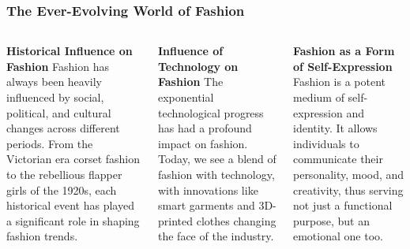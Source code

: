 \documentclass[5pt]{beamer}
\begin{document}
\begin{frame}
\frametitle{The Ever-Evolving World of Fashion}
\begin{columns}
\begin{column}{0.3\textwidth}
\begin{block}{\textbf{Historical Influence on Fashion}}
Fashion has always been heavily influenced by social, political, and cultural changes across different periods. From the Victorian era corset fashion to the rebellious flapper girls of the 1920s, each historical event has played a significant role in shaping fashion trends.
\end{block}
\end{column}
\begin{column}{0.3\textwidth}
\begin{block}{\textbf{Influence of Technology on Fashion}}
The exponential technological progress has had a profound impact on fashion. Today, we see a blend of fashion with technology, with innovations like smart garments and 3D-printed clothes changing the face of the industry.
\end{block}
\end{column}
\begin{column}{0.3\textwidth}
\begin{block}{\textbf{Fashion as a Form of Self-Expression}}
Fashion is a potent medium of self-expression and identity. It allows individuals to communicate their personality, mood, and creativity, thus serving not just a functional purpose, but an emotional one too.
\end{block}
\end{column}
\end{columns}
\end{frame}
\end{document}
